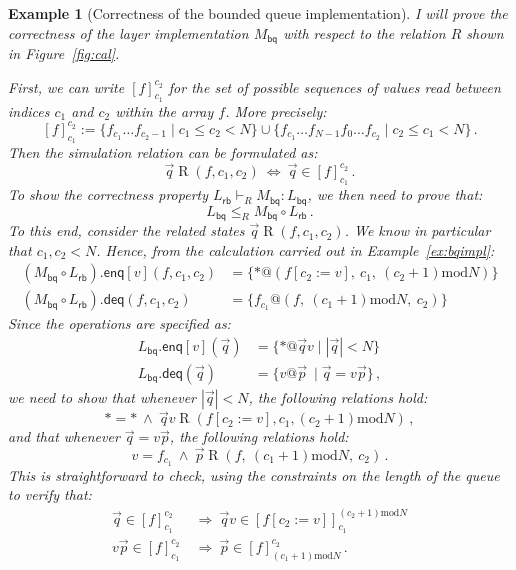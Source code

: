 \documentclass[11pt,oneside,draft]{book}
\newtheorem{example}[theorem]{Example}
\theoremstyle{definition}
\newcommand{\kw}[1]{\ensuremath{ \mathsf{#1} }}
\begin{document}
\begin{example}[Correctness of the bounded queue implementation] %
I will prove the correctness of
the layer implementation $M_\kw{bq}$
with respect to the relation $R$
shown in Figure~\ref{fig:cal}.

First,
we can write $[f]_{c_1}^{c_2}$
for the set of possible sequences of values
read between indices $c_1$ and $c_2$
within the array $f$.
More precisely:
\[
  [f]_{c_1}^{c_2} :=
    \{ f_{c_1} \ldots f_{c_2 - 1} \mid c_1 \le c_2 < N \} \cup
    \{ f_{c_1} \ldots f_{N-1} f_0 \ldots f_{c_2} \mid c_2 \le c_1 < N \}
  \,.
\]
Then the simulation relation can be formulated as:
\[
  \vec{q} \mathrel{R} (f, c_1, c_2)
  \: \Leftrightarrow \:
  \vec{q} \in [f]_{c_1}^{c_2}
  \,.
\]
To show the correctness property
$
  L_\kw{rb} \vdash_R M_\kw{bq} : L_\kw{bq}
$,
we then need to prove that:
\[
  L_\kw{bq} \le_R M_\kw{bq} \circ L_\kw{rb}
  \,.
\]
To this end,
consider the related states
$\vec{q} \mathrel{R} (f, c_1, c_2)$.
We know in particular that $c_1, c_2 < N$.
Hence, from the calculation
carried out in Example~\ref{ex:bqimpl}:
\begin{align*}
  (M_\kw{bq} \circ L_\kw{rb}).{\kw{enq}[v]}(f, c_1, c_2)
    &= \{ *@(f[c_2 := v], \:
          c_1, \:
          (c_2 + 1) \mathbin{\mathrm{mod}} N) \}
  \\
  (M_\kw{bq} \circ L_\kw{rb}).\kw{deq}(f, c_1, c_2)
    &= \{ f_{c_1}@(f, \:
          (c_1 + 1) \mathbin{\mathrm{mod}} N, \:
          c_2) \}
\end{align*}
Since the operations are specified as:
\begin{align*}
  L_\kw{bq}.\kw{enq}[v](\vec{q}) &=
    \{ * @ \vec{q} v \mid |\vec{q}| < N \}
  \\
  L_\kw{bq}.\kw{deq}(\vec{q}) &=
    \{ v @ \vec{p} \: \mid \vec{q} = v \vec{p} \}
  \,,
\end{align*}
we need to show that whenever
$|\vec{q}| < N$,
the following relations hold:
\[
  {*} = {*}
  \: \wedge \:
  \vec{q}v \mathrel{R}
    (f[c_2 := v], c_1, (c_2 + 1) \mathbin{\mathrm{mod}} N)
  \,,
\]
and that whenever $\vec{q} = v\vec{p}$,
the following relations hold:
\[
  v = f_{c_1}
  \: \wedge \:
  \vec{p} \mathrel{R}
    (f, \:
     (c_1 + 1) \mathbin{\mathrm{mod}} N, \:
     c_2)
  \,.
\]
This is straightforward to check,
using the constraints on the length of the queue
to verify that:
\begin{align*}
  \vec{q} \in [f]_{c_1}^{c_2}
    \: &\Rightarrow \:
    \vec{q}v \in [f[c_2 := v]]_{c_1}^{(c_2+1) \mathbin{\mathrm{mod}} N}
  \\
  v\vec{p} \in [f]_{c_1}^{c_2}
    \: &\Rightarrow \:
    \vec{p} \in [f]_{(c_1+1) \mathbin{\mathrm{mod}} N}^{c_2}
  \,.
\end{align*}
\end{example}
\end{document}

